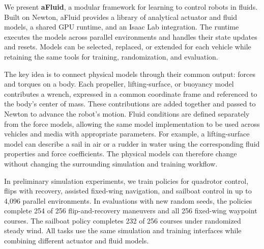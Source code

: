 We present \textbf{aFluid}, a modular framework for learning to control
robots in fluids.
%
Built on Newton, aFluid provides a library of analytical actuator and
fluid models, a shared GPU runtime, and an Isaac Lab integration.
%
The runtime executes the models across parallel environments and
handles their state updates and resets.
%
Models can be selected, replaced, or extended for each vehicle while
retaining the same tools for training, randomization, and evaluation.

The key idea is to connect physical models through their common
output: forces and torques on a body.
%
Each propeller, lifting-surface, or buoyancy model contributes a
wrench, expressed in a common coordinate frame and referenced to the
body's center of mass.
%
These contributions are added together and passed to Newton to
advance the robot's motion.
%
Fluid conditions are defined separately from the force models,
allowing the same model implementation to be used across vehicles
and media with appropriate parameters.
%
For example, a lifting-surface model can describe a sail in air or a
rudder in water using the corresponding fluid properties and force
coefficients.
%
The physical models can therefore change without changing the
surrounding simulation and training workflow.

In preliminary simulation experiments, we train policies for quadrotor
control, flips with recovery, assisted fixed-wing navigation, and
sailboat control in up to 4,096 parallel environments.
%
In evaluations with new random seeds, the policies complete 254 of
256 flip-and-recovery maneuvers and all 256 fixed-wing waypoint
courses.
%
The sailboat policy completes 232 of 256 courses under randomized
steady wind.
%
All tasks use the same simulation and training interfaces while
combining different actuator and fluid models.